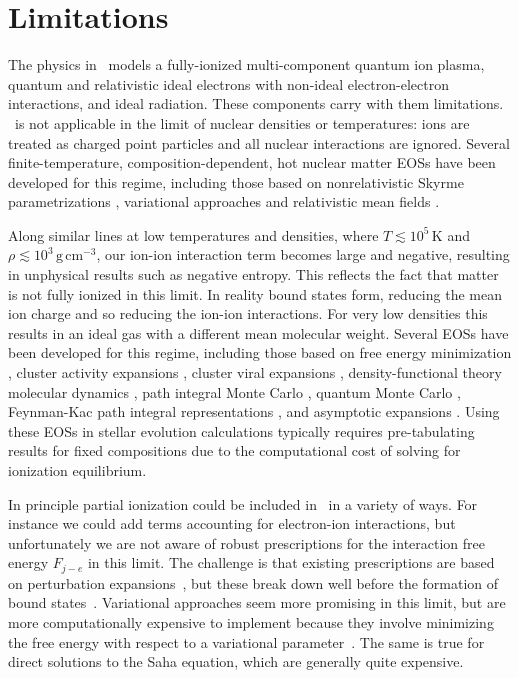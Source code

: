 \section{Limitations} \label{sec:limitations}

The physics in \skye\ models a fully-ionized multi-component quantum ion plasma, quantum and relativistic ideal electrons with non-ideal electron-electron interactions, and ideal radiation.
These components carry with them limitations.
\skye\ is not applicable in the limit of nuclear densities or temperatures: ions are treated as charged point particles and all nuclear interactions are ignored.
Several finite-temperature, composition-dependent, hot nuclear matter EOSs 
have been developed for this regime, including those based on nonrelativistic Skyrme parametrizations
\citep{lattimer_1991_aa,schneider_2017_aa}, variational approaches \citep{togashi_2017_aa} 
and relativistic mean fields \citep{sugahara_1994_aa,shen_1998_aa,typel_2010_aa,fattoyev_2010_aa,steiner_2013_aa}.


Along similar lines at low temperatures and densities, where $T \lesssim 10^{5}\,\mathrm{K}$ and $\rho \lesssim 10^3\,\mathrm{g\,cm^{-3}}$, our ion-ion interaction term becomes large and negative, resulting in unphysical results such as negative entropy.
This reflects the fact that matter is not fully ionized in this limit.
In reality bound states form, reducing the mean ion charge and so reducing the ion-ion interactions.
For very low densities this results in an ideal gas with a different mean molecular weight.
Several EOSs have been developed for this regime, including those based on 
free energy minimization \citep{Saumon1995,Irwin2004},
cluster activity expansions \citep{rogers_1974_aa,rogers_1981_aa,Rogers2002},
cluster viral expansions \citep{omarbakiyeva_2015_aa,ballenegger_2018_aa},
density-functional theory molecular dynamics \citep{militzer_2013_aa,2014ApJS..215...21B}, 
path integral Monte Carlo \citep{militzer_2001_aa}, 
quantum Monte Carlo \citep{mazzola_2018_aa},
Feynman-Kac path integral representations \citep{alastuey_2020_aa}, and
asymptotic expansions \citep{alastuey_2012_aa}.
Using these EOSs in stellar evolution calculations typically requires 
pre-tabulating results for fixed compositions due to the computational cost of solving for ionization equilibrium.

In principle partial ionization could be included in \skye\ in a variety of ways.
For instance we could add terms accounting for electron-ion interactions, but unfortunately we are not aware of robust prescriptions for the interaction free energy $F_{j-e}$ in this limit.
The challenge is that existing prescriptions are based on perturbation expansions~\citep{1961ApJ...134..669S,Potekhin2010}, but these break down well before the formation of bound states~\citep{1976PhRvA..14..816G}.
Variational approaches seem more promising in this limit, but are more computationally expensive to implement because they involve minimizing the free energy with respect to a variational parameter~\citep{1976PhRvA..14..816G}.
The same is true for direct solutions to the Saha equation, which are generally quite expensive.

